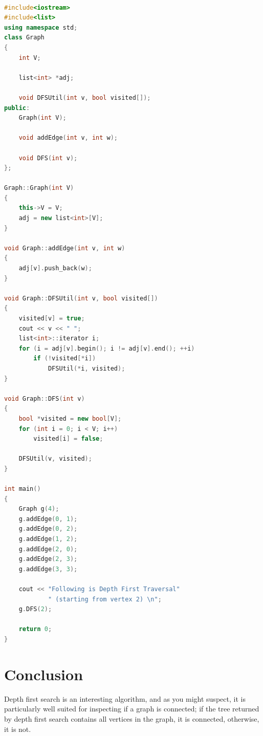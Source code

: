 \documentclass[12pt]{article}            %
\begin{document}
\begin{lstlisting}[language=C++]

#include<iostream>
#include<list>
using namespace std;
class Graph
{
    int V;    
 
    list<int> *adj;
 
    void DFSUtil(int v, bool visited[]);
public:
    Graph(int V);   
 
    void addEdge(int v, int w);
 
    void DFS(int v);
};
 
Graph::Graph(int V)
{
    this->V = V;
    adj = new list<int>[V];
}
 
void Graph::addEdge(int v, int w)
{
    adj[v].push_back(w); 
}
 
void Graph::DFSUtil(int v, bool visited[])
{
    visited[v] = true;
    cout << v << " ";
    list<int>::iterator i;
    for (i = adj[v].begin(); i != adj[v].end(); ++i)
        if (!visited[*i])
            DFSUtil(*i, visited);
}
 
void Graph::DFS(int v)
{
    bool *visited = new bool[V];
    for (int i = 0; i < V; i++)
        visited[i] = false;
 
    DFSUtil(v, visited);
}
 
int main()
{
    Graph g(4);
    g.addEdge(0, 1);
    g.addEdge(0, 2);
    g.addEdge(1, 2);
    g.addEdge(2, 0);
    g.addEdge(2, 3);
    g.addEdge(3, 3);
 
    cout << "Following is Depth First Traversal"
            " (starting from vertex 2) \n";
    g.DFS(2);
 
    return 0;
}
\end{lstlisting}

\section{Conclusion}  
Depth first search is an interesting algorithm, and as you might suspect, it is particularly well suited for inspecting if a graph is connected; if the tree returned by depth first search contains all vertices in the graph, it is connected, otherwise, it is not.

 
\end{document}
